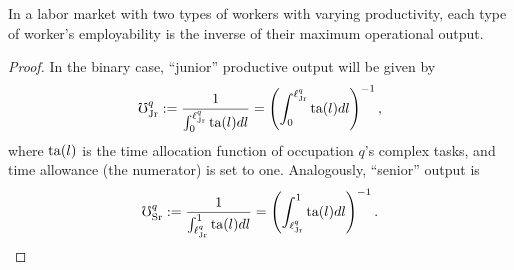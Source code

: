 \documentclass[hidelinks, nonatbib]{elsarticle}
\begin{document}
\begin{theorem}
    \label{bet}
    In a labor market with two types of workers with varying productivity, each type of worker's employability is the inverse of their maximum operational output.
    \begin{proof}
        In the binary case, ``junior'' productive output will be given by
        \begin{gather}
            \mho_{\text{Jr}}^{q}
            :=
            \frac{
                1
            }{
                \int_{0}^{\ell_{\text{Jr}}^{q}}
                \text{ta}(l)
                dl
            }
            = 
            \left(
                \int_{0}^{\ell_{\text{Jr}}^{q}}
                    \text{ta}(l)
                    dl
            \right) ^ {-1}
            ,
        \end{gather}
        where $\text{ta}(l)$ is the time allocation function of occupation $q$'s complex tasks, and time allowance (the numerator) is set to one. Analogously, ``senior'' output is
        \begin{gather}
            \mho_{\text{Sr}}^{q}
            :=
            \frac{
                1
            }{
                \int_{\ell_{\text{Jr}}^{q}}^{1}
                \text{ta}(l)
                dl
            }
            = 
            \left(
                \int_{\ell_{\text{Jr}}^{q}}^{1}
                    \text{ta}(l)
                    dl
            \right) ^ {-1}
            .
        \end{gather}


\end{proof}
\end{theorem}
\end{document}
